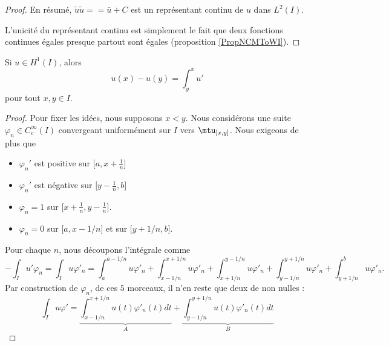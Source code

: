 \begin{proof}
        En résumé, \( \tilde u\tilde u==\bar u+C\) est un représentant continu de \( u\) dans \( L^2(I)\).

        L'unicité du représentant continu est simplement le fait que deux fonctions continues égales presque partout sont égales (proposition  \ref{PropNCMToWI}).
    
\end{proof}

\begin{proposition}     \label{PropGWOIoDg}
    Si \( u\in H^1(I)\), alors
    \begin{equation}
        u(x)-u(y)=\int_y^xu'
    \end{equation}
    pour tout \( x,y\in I\).
\end{proposition}

\begin{proof}
    Pour fixer les idées, nous supposons \( x<y\). Nous considérons une suite \( \varphi_n\in C^{\infty}_c(I)\) convergeant uniformément sur \( I\) vers \( \mtu_{\mathopen[ x , y \mathclose]}\). Nous exigeons de plus que 
    \begin{itemize}
        \item 
        \( \varphi_n'\) est positive sur \( \mathopen[ a , x+\frac{1}{ n } \mathclose]\)
    \item
        \( \varphi_n'\) est négative sur \( \mathopen[ y-\frac{1}{ n } , b \mathclose]\) 
    \item
        \( \varphi_n=1\) sur \( \mathopen[ x+\frac{1}{ n } , y-\frac{1}{ n } \mathclose]\).
    \item
        \( \varphi_n=0\) sur \( \mathopen[ a , x-1/n \mathclose]\) et sur \( \mathopen[ y+1/n , b \mathclose]\).
    \end{itemize}
    Pour chaque \( n\), nous découpons l'intégrale comme
    \begin{equation}        \label{EqRPwqpve}
        -\int_Iu'\varphi_n=\int_Iu\varphi'_n=\int_a^{a-1/n}u\varphi'_n+\int_{x-1/n}^{x+1/n}u\varphi'_n+\int_{x+1/n}^{y-1/n}u\varphi'_n+\int_{y-1/n}^{y+1/n}u\varphi'_n+\int_{y+1/n}^{b}u\varphi'_n.
    \end{equation}
    Par construction de \( \varphi_n\), de ces \( 5\) morceaux, il n'en reste que deux de non nulles :
    \begin{equation}
        \int_Iu\varphi'=\underbrace{\int_{x-1/n}^{x+1/n}u(t)\varphi'_n(t)dt}_A+\underbrace{\int_{y-1/n}^{y+1/n}u(t)\varphi'_n(t)dt}_B
    \end{equation}


\end{proof}
